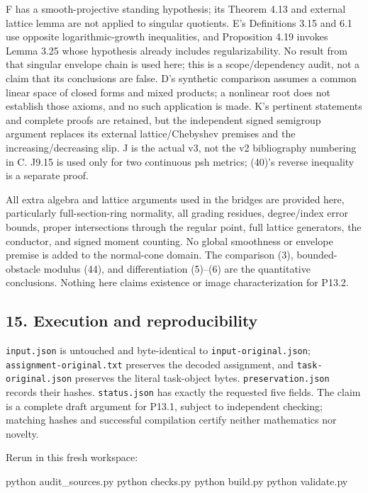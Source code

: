 \documentclass[
  10pt,
]{article}
\newenvironment{Shaded}{}{}
\newcommand{\ExtensionTok}[1]{#1}
\newcommand{\NormalTok}[1]{#1}
\begin{document}
F has a smooth-projective standing hypothesis; its Theorem 4.13 and
external lattice lemma are not applied to singular quotients. E's
Definitions 3.15 and 6.1 use opposite logarithmic-growth inequalities,
and Proposition 4.19 invokes Lemma 3.25 whose hypothesis already
includes regularizability. No result from that singular envelope chain
is used here; this is a scope/dependency audit, not a claim that its
conclusions are false. D's synthetic comparison assumes a common linear
space of closed forms and mixed products; a nonlinear root does not
establish those axioms, and no such application is made. K's pertinent
statements and complete proofs are retained, but the independent signed
semigroup argument replaces its external lattice/Chebyshev premises and
the increasing/decreasing slip. J is the actual v3, not the v2
bibliography numbering in C. J9.15 is used only for two continuous psh
metrics; (40)'s reverse inequality is a separate proof.

All extra algebra and lattice arguments used in the bridges are provided
here, particularly full-section-ring normality, all grading residues,
degree/index error bounds, proper intersections through the regular
point, full lattice generators, the conductor, and signed moment
counting. No global smoothness or envelope premise is added to the
normal-cone domain. The comparison (3), bounded-obstacle modulus (44),
and differentiation (5)--(6) are the quantitative conclusions. Nothing
here claims existence or image characterization for P13.2.

\subsection{15. Execution and
reproducibility}\label{execution-and-reproducibility}

\texttt{input.json} is untouched and byte-identical to
\texttt{input-original.json}; \texttt{assignment-original.txt} preserves
the decoded assignment, and \texttt{task-original.json} preserves the
literal task-object bytes. \texttt{preservation.json} records their
hashes. \texttt{status.json} has exactly the requested five fields. The
claim is a complete draft argument for P13.1, subject to independent
checking; matching hashes and successful compilation certify neither
mathematics nor novelty.

Rerun in this fresh workspace:

\begin{Shaded}
\begin{Highlighting}[]
\ExtensionTok{python}\NormalTok{ audit\_sources.py}
\ExtensionTok{python}\NormalTok{ checks.py}
\ExtensionTok{python}\NormalTok{ build.py}
\ExtensionTok{python}\NormalTok{ validate.py}
\end{Highlighting}
\end{Shaded}
\end{document}
